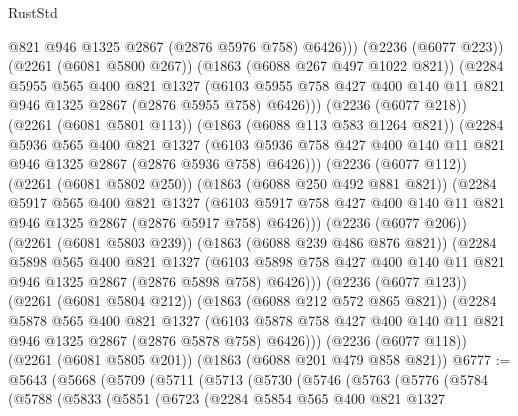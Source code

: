 \begin{lexlean}{RustStd}
\begin{coremodule}
                    @821
                    @946
                    @1325
                    @2867
                    (@2876 @5976 @758)
                    @6426)))
              (@2236 (@6077 @223))
              (@2261 (@6081 @5800 @267))
              (@1863 (@6088 @267 @497 @1022 @821))
              (@2284
                @5955
                @565
                @400
                @821
                @1327
                (@6103
                  @5955
                  @758
                  @427
                  @400
                  @140
                  @11
                  @821
                  @946
                  @1325
                  @2867
                  (@2876 @5955 @758)
                  @6426)))
            (@2236 (@6077 @218))
            (@2261 (@6081 @5801 @113))
            (@1863 (@6088 @113 @583 @1264 @821))
            (@2284
              @5936
              @565
              @400
              @821
              @1327
              (@6103 @5936 @758 @427 @400 @140 @11 @821 @946 @1325 @2867 (@2876 @5936 @758) @6426)))
          (@2236 (@6077 @112))
          (@2261 (@6081 @5802 @250))
          (@1863 (@6088 @250 @492 @881 @821))
          (@2284
            @5917
            @565
            @400
            @821
            @1327
            (@6103 @5917 @758 @427 @400 @140 @11 @821 @946 @1325 @2867 (@2876 @5917 @758) @6426)))
        (@2236 (@6077 @206))
        (@2261 (@6081 @5803 @239))
        (@1863 (@6088 @239 @486 @876 @821))
        (@2284
          @5898
          @565
          @400
          @821
          @1327
          (@6103 @5898 @758 @427 @400 @140 @11 @821 @946 @1325 @2867 (@2876 @5898 @758) @6426)))
      (@2236 (@6077 @123))
      (@2261 (@6081 @5804 @212))
      (@1863 (@6088 @212 @572 @865 @821))
      (@2284
        @5878
        @565
        @400
        @821
        @1327
        (@6103 @5878 @758 @427 @400 @140 @11 @821 @946 @1325 @2867 (@2876 @5878 @758) @6426)))
    (@2236 (@6077 @118))
    (@2261 (@6081 @5805 @201))
    (@1863 (@6088 @201 @479 @858 @821))
@6777 := @5643
    (@5668
      (@5709
        (@5711
          (@5713
            (@5730
              (@5746
                (@5763
                  (@5776
                    (@5784
                      (@5788
                        (@5833
                          (@5851
                            (@6723
                              (@2284
                                @5854
                                @565
                                @400
                                @821
                                @1327

\end{coremodule}
\end{lexlean}
